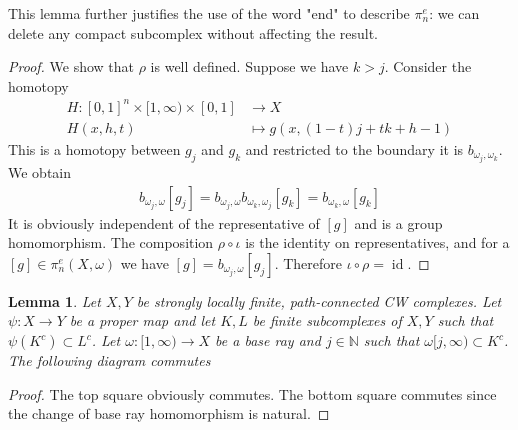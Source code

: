 \documentclass[a4paper,11pt]{article}
\theoremstyle{definition}
\theoremstyle{plain}
\newtheorem{lemma}[definition]{Lemma}
\theoremstyle{remark}
\DeclareMathOperator{\id}{id}
\begin{document}
{This lemma further justifies the use of the word "end" to describe $\pi_{n}^{e}$: we can delete any compact subcomplex without affecting the result. 

\begin{proof} We show that $\rho$ is well defined. Suppose we have $k>j$. Consider the homotopy  
\begin{align*}
H:  [0,1]^n \times [1,\infty) \times [0,1] &\rightarrow X \\
H(x,h,t) &\mapsto g(x,(1-t)j+tk+h-1)
\end{align*}
This is a homotopy between $g_{j}$ and $g_{k}$ and restricted to the boundary it is $b_{\omega_{j},\omega_{k}}$. We obtain 
\begin{align*}
b_{\omega_{j},\omega} [g_{j}] = b_{\omega_{j},\omega}b_{\omega_{k},\omega_{j}}[g_{k}] = b_{\omega_{k},\omega} [g_{k}]
\end{align*}
It is obviously independent of the representative of $[g]$ and is a group homomorphism. The composition $\rho \circ \iota$ is the identity on representatives, and for a $[g]\in \pi_{n}^{e}(X,\omega)$ we have $[g] = b_{\omega_{j},\omega} [g_{j}]$. Therefore $\iota \circ \rho = \id$. 
\end{proof}

\begin{lemma} Let $X,Y$ be strongly locally finite, path-connected CW complexes. Let $\psi :X\rightarrow Y$ be a proper map and let $K,L$ be finite subcomplexes of $X,Y$ such that $\psi(K^c)\subset L^c$. Let $\omega:[1,\infty)\rightarrow X$ be a base ray and $j\in \mathbb{N}$ such that $\omega[j,\infty)\subset K^c$. The following diagram commutes

\begin{figure}[H]
\center
{}
\end{figure}
\end{lemma}

\begin{proof} The top square obviously commutes. The bottom square commutes since the change of base ray homomorphism is natural. 
\end{proof}

}
\end{document}
